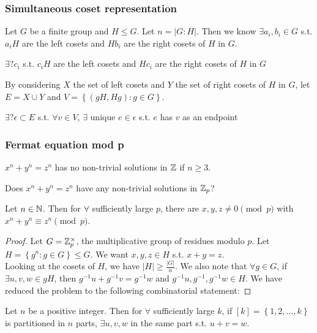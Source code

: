 \subsubsection{Simultaneous coset representation}
Let $G$ be a finite group and $H \leq G$. Let $n = \left|G:H\right|$. Then we know $\exists a_i, b_i \in G$ s.t. $a_i H$ are the left cosets and $H b_i$ are the right cosets of $H$ in $G$.
\begin{question}
	$\exists ? c_i $ s.t. $c_i H$ are the left cosets and $H c_i$ are the right cosets of $H$ in $G$
\end{question}
By considering $X$ the set of left cosets and $Y$ the set of right cosets of $H$ in $G$, let $E = X \cup Y$ and $V = \left\lbrace (gH, Hg) : g \in G \right\rbrace$.
\begin{question}
	$\exists ? \epsilon \subset E$ s.t. $\forall v \in V$, $\exists$ unique $e \in \epsilon$ s.t. $e$ has $v$ as an endpoint
\end{question}
\subsubsection{Fermat equation mod p}
$x^n + y^n = z^n$ has no non-trivial solutions in $\mathbb{Z}$ if $n \geq 3$.
\begin{question}
	Does $x^n + y^n = z^n$ have any non-trivial solutions in $\mathbb{Z}_p$?
\end{question}
\begin{theorem}
	Let $n \in \mathbb{N}$. Then for $\forall$ sufficiently large $p$, there are $x,y,z \neq 0 \pmod{p}$ with $x^n + y^n \equiv z^n \pmod{p}$.
\end{theorem}
\begin{proof}
	Let $G = \mathbb{Z}_p^\times$, the multiplicative group of residues modulo $p$. Let $H = \left\lbrace g^n : g \in G \right\rbrace \leq G$. We want $x, y, z \in H$ s.t. $x+y=z$.\\
	Looking at the cosets of $H$, we have $\left|H\right| \geq \frac{\left|G\right|}{n}$. We also note that $\forall g \in G$, if $\exists u,v,w \in gH$, then $g^{-1}u + g^{-1}v = g^{-1}w$ and $g^{-1}u, g^{-1}, g^{-1}w \in H$. We have reduced the problem to the following combinatorial statement:
\end{proof}
\begin{theorem}
	Let $n$ be a positive integer. Then for $\forall$ sufficiently large $k$, if $\left[k\right] = \left\lbrace 1, 2, ..., k \right\rbrace$ is partitioned in $n$ parts, $\exists u, v, w$ in the same part s.t. $u+v=w$.	
\end{theorem}

